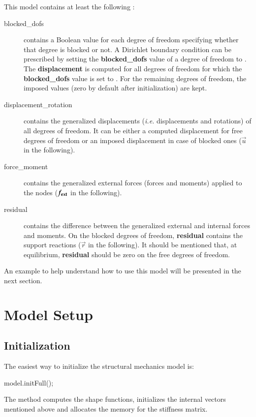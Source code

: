 \vspace{1cm}
This model contains at least the following :
\begin{description}
\item[blocked\_dofs] contains a Boolean value for each degree of
  freedom specifying whether that degree is blocked or not. A
  Dirichlet boundary condition can be prescribed by setting the
  \textbf{blocked\_dofs} value of a degree of freedom to
  . The \textbf{displacement} is computed for all degrees
  of freedom for which the \textbf{blocked\_dofs} value is set to
  . For the remaining degrees of freedom, the imposed
  values (zero by default after initialization) are kept.



\item[displacement\_rotation] contains the generalized displacements
  (\textit{i.e.} displacements and rotations) of all degrees of freedom. It can be
  either a computed displacement for free degrees of freedom or an
  imposed displacement in case of blocked ones ($\vec{u}$ in the
  following).

\item[force\_moment] contains the generalized external forces (forces
  and moments) applied to the nodes ($\boldsymbol{f_{{\mathrm{ext}}}}$ in the
  following).

\item[residual] contains the difference between the generalized external and internal
  forces and moments. On the blocked degrees of freedom,
  \textbf{residual} contains the support reactions ($\vec{r}$ in the
  following).  It should be mentioned that, at equilibrium,
  \textbf{residual} should be zero on the free degrees of freedom.
\end{description}

An example to help understand how  to use this model will be presented in the
next section.

\section{Model Setup}
\label{sec:structMechMod:setup}

\subsection{Initialization}
The easiest way to initialize the structural mechanics model is:


\begin{cpp}
  model.initFull();
\end{cpp}
The method  computes the shape functions, initializes
the internal vectors mentioned above and allocates the memory for the
stiffness matrix.

